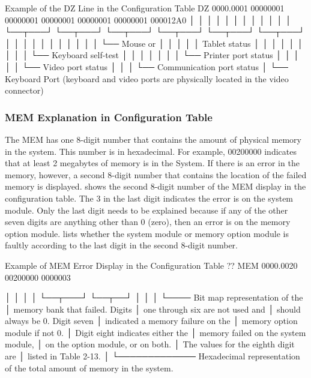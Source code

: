 \begin{ttfig}{Example of the DZ Line in the Configuration Table}
DZ        0000.0001
    00000001 00000001 00000001 00000001 00000001 000012A0
    │      │ │      │ │      │ │      │ │      │ │      │
    └──┬───┘ └──┬───┘ └──┬───┘ └──┬───┘ └──┬───┘ └──┬───┘
       │        │        │        │        │        │
       │        │        │        │        │        └── Mouse or
       │        │        │        │        │        Tablet status
       │        │        │        │        │
       │        │        │        │        └── Keyboard self-test
       │        │        │        │
       │        │        │        └── Printer port status
       │        │        │
       │        │        └── Video port status
       │        │
       │        └── Communication port status
       │
       └── Keyboard Port (keyboard and video ports are physically
                          located in the video connector)
\end{ttfig}

\subsubsection{MEM Explanation in Configuration Table}

The MEM has one 8-digit number that contains the amount of physical
memory in the system. This number is in hexadecimal. For example,
00200000 indicates that at least 2 megabytes of memory is in the System.
If there is an error in the memory, however, a second 8-digit number that
contains the location of the failed memory is displayed.  shows
the second 8-digit number of the MEM display in the configuration table.
The 3 in the last digit indicates the error is on the system module. Only
the last digit needs to be explained because if any of the other seven digits
are anything other than 0 (zero), then an error is on the memory option
module.  lists whether the system module or memory option
module is faultly according to the last digit in the second 8-digit number.

\begin{ttfig}{Example of MEM Error Display in the Configuration Table}
?? MEM       0000.0020
       00200000 0000003

       │      │ │     │
       └──┬───┘ └──┬──┘
          │        │
          │        └──── Bit map representation of the
          │              memory bank that failed. Digits
          │              one through six are not used and
          │              should always be 0. Digit seven
          │              indicated a memory failure on the
          │              memory option module if not 0.
          │              Digit eight indicates either the
          │              memory failed on the system module,
          │              on the option module, or on both.
          │              The values for the eighth digit are
          │              listed in Table 2-13.
          │
          └───────────── Hexadecimal representation of the
                         total amount of memory in the system.
\end{ttfig}

